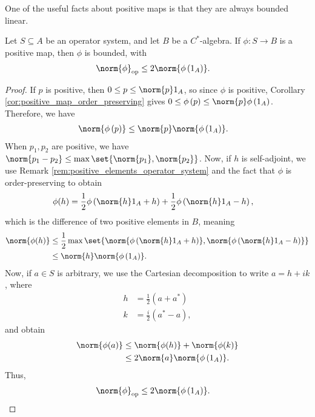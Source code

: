 One of the useful facts about positive maps is that they are always bounded linear.
\begin{proposition}
  Let $S\subseteq A$ be an operator system, and let $B$ be a $C^{\ast}$-algebra. If $\phi\colon S\rightarrow B$ is a positive map, then $\phi$ is bounded, with
  \begin{align*}
    \norm{\phi}_{\op} &\leq 2\norm{\phi\left( 1_A \right)}.
  \end{align*}
\end{proposition}
\begin{proof}
  If $p$ is positive, then $0\leq p \leq \norm{p}1_A$, so since $\phi$ is positive, Corollary \ref{cor:positive_map_order_preserving} gives $0\leq \phi\left( p \right)\leq \norm{p}\phi\left( 1_A \right)$. Therefore, we have
  \begin{align*}
    \norm{\phi\left( p \right)} &\leq \norm{p}\norm{\phi\left( 1_A \right)}.
  \end{align*}
  When $p_1,p_2$ are positive, we have $\norm{p_1 - p_2}\leq \max\set{\norm{p_1},\norm{p_2}}$. Now, if $h$ is self-adjoint, we use Remark \ref{rem:positive_elements_operator_system} and the fact that $\phi$ is order-preserving to obtain
  \begin{align*}
    \phi(h) &= \frac{1}{2}\phi\left( \norm{h}1_A + h \right) + \frac{1}{2}\phi\left( \norm{h}1_A - h \right),
  \end{align*}
  which is the difference of two positive elements in $B$, meaning
  \begin{align*}
    \norm{\phi(h)} &\leq \frac{1}{2}\max\set{\norm{\phi\left( \norm{h}1_A + h \right)},\norm{\phi\left( \norm{h}1_A - h \right)}}\\
                   &\leq \norm{h}\norm{\phi\left( 1_A \right)}.
  \end{align*}
  Now, if $a\in S$ is arbitrary, we use the Cartesian decomposition to write $a = h + ik$, where
  \begin{align*}
    h &= \frac{1}{2}\left( a + a^{\ast} \right)\\
    k &= \frac{i}{2}\left( a^{\ast}-a \right),
  \end{align*}
  and obtain
  \begin{align*}
    \norm{\phi(a)} &\leq \norm{\phi(h)} + \norm{\phi(k)}\\
                   &\leq 2\norm{a}\norm{\phi\left( 1_A \right)}.
  \end{align*}
  Thus,
  \begin{align*}
    \norm{\phi}_{\op} &\leq 2\norm{\phi\left( 1_A \right)}.
  \end{align*}
\end{proof}
